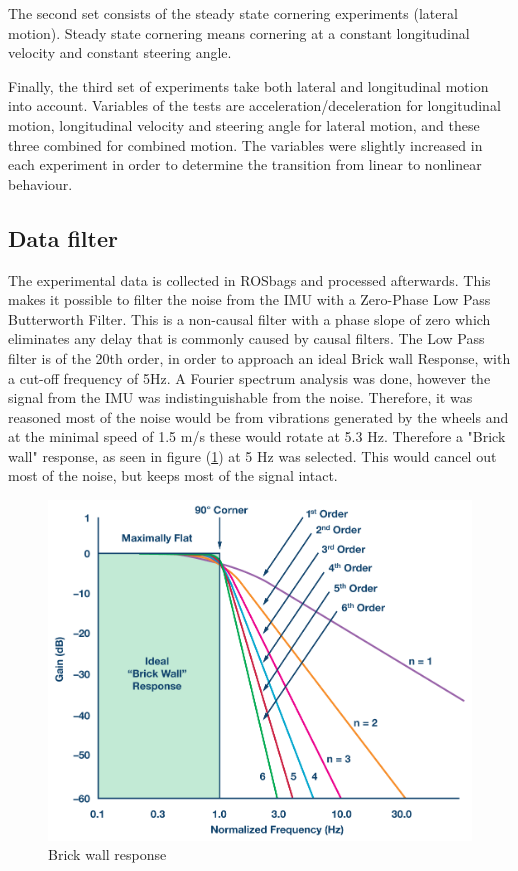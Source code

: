 The second set consists of the steady state cornering experiments (lateral motion). Steady state cornering means cornering at a constant longitudinal velocity and constant steering angle. 

Finally, the third set of experiments take both lateral and longitudinal motion into account. Variables of the tests are acceleration/deceleration for longitudinal motion, longitudinal velocity and steering angle for lateral motion, and these three combined for combined motion. The variables were slightly increased in each experiment in order to determine the transition from linear to nonlinear behaviour.

\subsection{Data filter} 	
The experimental data is collected in ROSbags and processed afterwards. This makes it possible to filter the noise from the IMU with a Zero-Phase Low Pass Butterworth Filter. This is a non-causal filter with a phase slope of zero which eliminates any delay that is commonly caused by causal filters. The Low Pass filter is of the 20th order, in order to approach an ideal Brick wall Response, with a cut-off frequency of 5Hz. A Fourier spectrum analysis was done, however the signal from the IMU was indistinguishable from the noise. Therefore, it was reasoned most of the noise would be from vibrations generated by the wheels and at the minimal speed of 1.5 m/s these would rotate at 5.3 Hz. Therefore a "Brick wall" response, as seen in figure (\ref{fig:brickwall}) at 5 Hz was selected. This would cancel out most of the noise, but keeps most of the signal intact. 
	\begin{figure}
	\centering
	\includegraphics[scale=0.17]{figure/brickwall.png}
	\caption{Brick wall response}
	\label{fig:brickwall}
	\end{figure}





